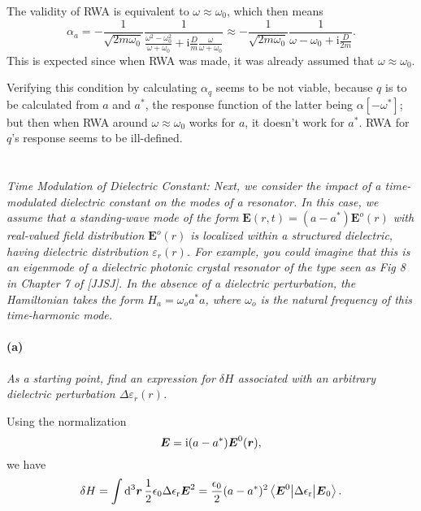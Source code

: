 \documentclass[hyperref, a4paper]{article}
\newcommand*{\ii}{\mathrm{i}}
\newcommand{\epsr}{\epsilon_{\text{r}}}
\begin{document}
The validity of RWA is equivalent to $\omega \approx \omega_0$, 
which then means 
\begin{equation}
    \alpha_a = - \frac{1}{\sqrt{2 m \omega_0}} \frac{1}{\frac{\omega^2 - \omega_0^2}{\omega + \omega_0} + \ii \frac{D}{m} \frac{\omega}{\omega+ \omega_0}}
    \approx - \frac{1}{\sqrt{2 m \omega_0}} \frac{1}{\omega - \omega_0 + \ii \frac{D}{2m}}.
\end{equation}
This is expected since when RWA was made, it was already assumed that $\omega \approx \omega_0$.

Verifying this condition by calculating $\alpha_q$ seems to be not viable, 
because $q$ is to be calculated from $a$ and $a^*$, 
the response function of the latter being $\alpha[-\omega^*]$; 
but then when RWA around $\omega \approx \omega_0$ works for $a$, 
it doesn't work for $a^*$.
RWA for $q$'s response seems to be ill-defined.

\section{}

\textit{Time Modulation of Dielectric Constant: Next, we consider the impact of a time-modulated dielectric constant on the modes of a resonator. In this case, we assume that a standing-wave mode of the form $\mathbf{E}(r, t)=\left(a-a^*\right) \mathbf{E}^o(r)$ with real-valued field distribution $\mathbf{E}^o(r)$ is localized within a structured dielectric, having dielectric distribution $\varepsilon_r(r)$. For example, you could imagine that this is an eigenmode of a dielectric photonic crystal resonator of the type seen as Fig 8 in Chapter 7 of [JJSJ]. In the absence of a dielectric perturbation, the Hamiltonian takes the form $H_a=\omega_o a^* a$, where $\omega_o$ is the natural frequency of this time-harmonic mode.}

\paragraph*{(a)} \textit{As a starting point, find an expression for $\delta H$ associated with an arbitrary dielectric perturbation $\Delta \varepsilon_r(r)$.} 

Using the normalization 
\begin{equation}
    \vb*{E} = \ii (a - a^*) \vb*{E}^0(\vb*{r}),
\end{equation}
we have 
\begin{equation}
    \var{H} = \int \dd[3]{\vb*{r}} \frac{1}{2} \epsilon_0 \Delta \epsr \vb*{E}^2
    = \frac{\epsilon_0}{2} (a - a^*)^2 \mel**{\vb*{E}^0}{\Delta \epsr}{\vb*{E}_0}.
\end{equation}
\end{document}
